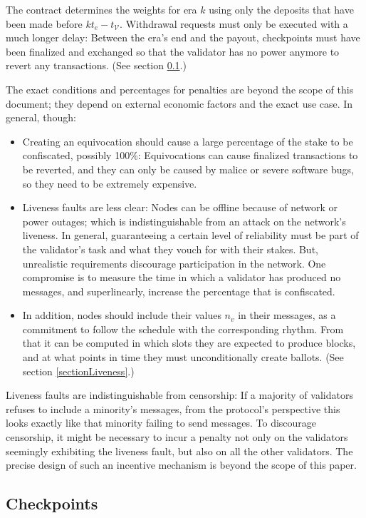 \documentclass[12pt]{article}
\begin{document}
The contract determines the weights for era $k$ using only the deposits that have been made before $k t_e - t_{\mathcal{V}}$. Withdrawal requests must only be executed with a much longer delay: Between the era's end and the payout, checkpoints must have been finalized and exchanged so that the validator has no power anymore to revert any transactions. (See section \ref{sectionCheckpoints}.)

The exact conditions and percentages for penalties are beyond the scope of this document; they depend on external economic factors and the exact use case. In general, though:
\begin{itemize}
  \item Creating an equivocation should cause a large percentage of the stake to be confiscated, possibly 100\%: Equivocations can cause finalized transactions to be reverted, and they can only be caused by malice or severe software bugs, so they need to be extremely expensive.
  \item Liveness faults are less clear: Nodes can be offline because of network or power outages; which is indistinguishable from an attack on the network's liveness. In general, guaranteeing a certain level of reliability must be part of the validator's task and what they vouch for with their stakes. But, unrealistic requirements discourage participation in the network. One compromise is to measure the time in which a validator has produced no messages, and superlinearly, increase the percentage that is confiscated.
  \item In addition, nodes should include their values $n_v$ in their messages, as a commitment to follow the schedule with the corresponding rhythm. From that it can be computed in which slots they are expected to produce blocks, and at what points in time they must unconditionally create ballots. (See section \ref{sectionLiveness}.)
\end{itemize}

Liveness faults are indistinguishable from censorship: If a majority of validators refuses to include a minority's messages, from the protocol's perspective this looks exactly like that minority failing to send messages. To discourage censorship, it might be necessary to incur a penalty not only on the validators seemingly exhibiting the liveness fault, but also on all the other validators. The precise design of such an incentive mechanism is beyond the scope of this paper.


\subsection{Checkpoints}
\label{sectionCheckpoints}
\end{document}
